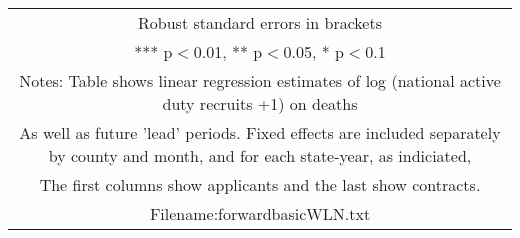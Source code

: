 \documentclass[]{article}
\begin{document}
\begin{tabular}{lcccccc}
\multicolumn{7}{c}{ Robust standard errors in brackets} \\
\multicolumn{7}{c}{ *** p$<$0.01, ** p$<$0.05, * p$<$0.1} \\
\multicolumn{7}{c}{ Notes: Table shows linear regression estimates of log (national active duty recruits +1) on deaths} \\
\multicolumn{7}{c}{ As well as future 'lead' periods. Fixed effects are included separately by county and month, and for each state-year, as indiciated,} \\
\multicolumn{7}{c}{ The first columns show applicants and the last show contracts.} \\
\multicolumn{7}{c}{ Filename:forwardbasicWLN.txt} \\
\end{tabular}
\end{document}
